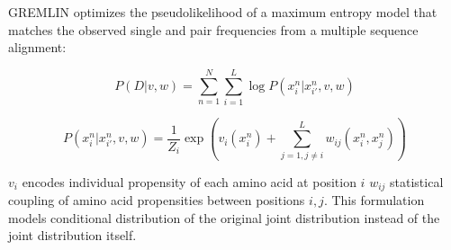 \documentclass[landscape]{sciposter}
\begin{document}
\begin{multicols}{3}
GREMLIN optimizes the pseudolikelihood  of a maximum entropy model that matches the observed single and pair frequencies from a multiple sequence alignment:

$$ P(D | v,w) = \sum_{n=1}^N \sum_{i=1}^L \log P (x_i^n | x_{i'}^n, v, w)$$

$$ P (x_i^n | x_{i'}^n, v, w) = \frac{1}{Z_i} \exp \left ( v_i(x_i^n) + \sum_{j=1,j \neq i}^L w_{ij}(x_i^n,x_j^n) \right )$$

$v_i$ encodes individual propensity of each amino acid at position $i$ $w_{ij}$ statistical coupling of amino acid propensities between positions $i,j$. 
This formulation models conditional distribution of the original joint distribution instead of the joint distribution itself. 

\end{multicols}
\end{document}
